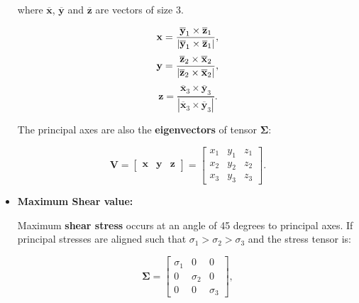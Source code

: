 \documentclass[10pt,b5paper,titlepage]{book}
\begin{document}
\begin{itemize}
        where $\overline{\mathbf{x}}$, $\overline{\mathbf{y}}$ and $\overline{\mathbf{z}}$ are vectors of size 3.

        \begin{equation}
              \mathbf{x} = \frac{\overline{\mathbf{y}}_{1} \times \overline{\mathbf{z}}_{1}}
              {|\overline{\mathbf{y}}_{1} \times \overline{\mathbf{z}}_{1}|}\\
        ,\end{equation}
        \begin{equation}
              \mathbf{y} = \frac{\overline{\mathbf{z}}_{2} \times \overline{\mathbf{x}}_{2}}
              {|\overline{\mathbf{z}}_{2} \times \overline{\mathbf{x}}_{2}|}\\
        ,\end{equation}
        \begin{equation}
              \mathbf{z} = \frac{\overline{\mathbf{x}}_{3} \times \overline{\mathbf{y}}_{3}}
              {|\overline{\mathbf{x}}_{3} \times \overline{\mathbf{y}}_{3}|}
        .\end{equation}

        The principal axes are also the \textbf{eigenvectors} of tensor $\mathbf{\Sigma}$:

        \begin{equation}
            \mathbf{V} = \begin{bmatrix}
                \mathbf{x} & \mathbf{y} & \mathbf{z}
            \end{bmatrix} = \begin{bmatrix}
                x_1 & y_1 & z_1 \\
                x_2 & y_2 & z_2 \\
                x_3 & y_3 & z_3
            \end{bmatrix}
        .\end{equation}

    \item \textbf{Maximum Shear value:}


        Maximum \textbf{shear stress} occurs at an angle of 45 degrees to principal axes.
        If principal stresses are aligned such that $\sigma_1 > \sigma_2 > \sigma_3$
        and the stress tensor is:

        \begin{equation}
            \mathbf{\Sigma} = \begin{bmatrix}
                \sigma_1 & 0 & 0 \\
                0 & \sigma_2 & 0 \\
                0 & 0 & \sigma_3
            \end{bmatrix}
        ,\end{equation}


\end{itemize}
\end{document}
